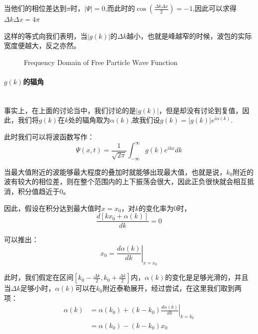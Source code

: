 \documentclass{article}
\begin{document}
当他们的相位差达到$\pi$时，$|\Psi|=0$,而此时的$\cos(\frac{\Delta k\Delta x}{2})=-1$,因此可以求得$\Delta k\Delta x=4\pi$

这样的等式向我们表明，当$|g(k)|$的$\Delta k$越小，也就是峰越窄的时候，波包的实际宽度便越大，反之亦然。







\begin{figure}[hbtp]
    \centering
    \caption{Frequency Domain of Free Particle Wave Function}
    \label{fig:frequency-domain}
\end{figure}




\paragraph{$g(k)$的辐角}\ \\
事实上，在上面的讨论当中，我们讨论的是$|g(k)|$，但是却没有讨论到复值，因此，我们将$g(k)$在$k$处的辐角取为$\alpha(k)$,故我们设$g(k)=|g(k)|e^{i\alpha(k)}$.

此时我们可以将波函数写作：
\[
    \Psi(x,t)=\frac{1}{\sqrt{2\pi}}\int_{-\infty}^{\infty}g(k)e^{ikx}dk
\]

当最大值附近的波能够最大程度的叠加时就能够出现最大值，也就是说，$k_0$附近的波有较大的相位差，则在整个范围内的上下振荡会很大，因此正负很快就会相互抵消，积分值趋近于$0$。

因此，假设在积分达到最大值时$x=x_0$，对$k$的变化率为$0$时，
\[
    \frac{d\left[kx_0+\alpha(k)\right]}{dk}=0
\]

可以推出：
\[
    x_0=\left.\frac{d\alpha(k)}{dk}\right|_{x=x_0}
\]

此时，我们假定在区间$\left[k_0-\frac{\Delta k}{2},k_0+\frac{\Delta k}{2}\right]$内，$\alpha(k)$的变化是足够光滑的，并且当$\Delta k$足够小时，$\alpha(k)$可以在$k_0$附近泰勒展开，经过尝试，在这里我们取到两项：
\begin{align}
    \alpha(k)&=\alpha(k_0)+\left(k-k_0\right)\left.\frac{d\alpha(k)}{dk}\right|_{k=k_0}\\
    &=\alpha(k_0)-(k-k_0)x_0
\end{align}
\end{document}
